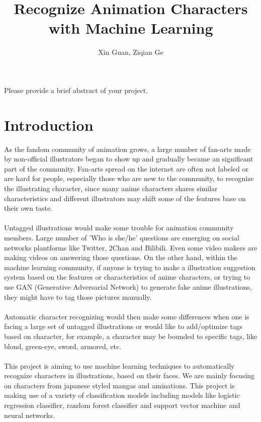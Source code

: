 \documentclass[11.5pt]{article}
\title{Recognize Animation Characters with Machine Learning}
\author{Xin Guan, Ziqian Ge}
\date{}
\begin{document}
\maketitle

\abstract
Please provide a brief abstract of your project.

\vspace{2mm}
\section{Introduction}
As the fandom community of animation grows, a large number of fan-arts made by non-official illustrators began to show up and gradually became an significant part of the community.
Fan-arts spread on the internet are often not labeled or are hard for people, especially those who are new to the community, to recognize the illustrating character, since many anime characters shares similar characteristics and different illustrators may shift some of the features base on their own taste.\\ \\
Untagged illustrations would make some trouble for animation community members. 
Large number of 'Who is she/he' questions are emerging on social networks plantforms like Twitter, 2Chan and Bilibili. 
Even some video makers are making videos on answering those questions. 
On the other hand, within the machine learning community, if anyone is trying to make a illustration suggestion system based on the features or characteristics of anime characters, or trying to use GAN (Generative Adversarial Network) to generate fake anime illustrations, they might have to tag those pictures manually.\\ \\
Automatic character recognizing would then make some differences when one is facing a large set of untagged illustrations or would like to add/optimize tags based on character, for example, a character may be bounded to specific tags, like blond, green-eye, sword, armored, etc.\\ \\
This project is aiming to use machine learning techniques to automatically recognize characters in illustrations, based on their faces. We are mainly focusing on characters from japanese styled mangas and aminations. This project is making use of a variety of classification models including models like logistic regression classifier, random forest classifier and support vector machine and neural networks.\\ \\
\end{document}
